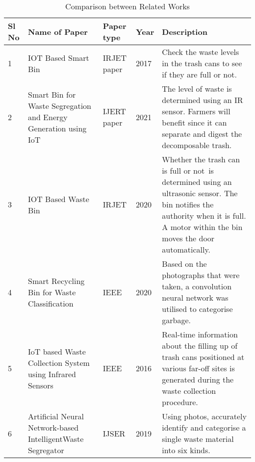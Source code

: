 \begin{table}
    	\centering
    	\caption{Comparison between Related Works}
    	\label{table }
    	\begin{tabular}{|p{.7cm}|p{3.5cm}|p{2.5cm}|p{1cm}|p{5.7cm}|}
    		\hline
    		           Sl No  & Name of Paper &	Paper type & Year & Description \\
    		
    		\hline
    		1&
    	IOT Based Smart Bin & 
    		IRJET paper & 
    		2017 &
    Check the waste levels in the trash cans to see if they are full or not.
\\
    		\hline
    		2 &
    		Smart Bin for Waste Segregation and Energy
Generation using IoT
 &
    		IJERT paper &
    		2021&
    		The level of waste is determined using an IR sensor. Farmers will benefit since it can separate and digest the decomposable trash. \\
    		\hline
    		3&
    IOT Based Waste
Bin &
    		IRJET
 &
    		2020&Whether the trash can is full or not is determined using an ultrasonic sensor. The bin notifies the authority when it is full. A motor within the bin moves the door automatically.\\
    		\hline
    		4&
    	Smart Recycling
Bin for Waste
Classification&	
    		IEEE
&

    		2020&Based on the photographs that were taken, a convolution neural network was utilised to categorise garbage.\\
            \hline
            5&
           IoT based Waste
Collection System
using Infrared Sensors &
IEEE
&
            2016&
           Real-time information about the filling up of trash cans positioned at various far-off sites is generated during the waste collection procedure.  \\
            	\hline	
            6 &
           Artificial Neural Network-based IntelligentWaste Segregator &
            IJSER
 &
            2019 &
           Using photos, accurately identify and categorise a single waste material into six kinds.
\\
\hline
 


           
    		\end{tabular}
    \end{table}
    \newpage
